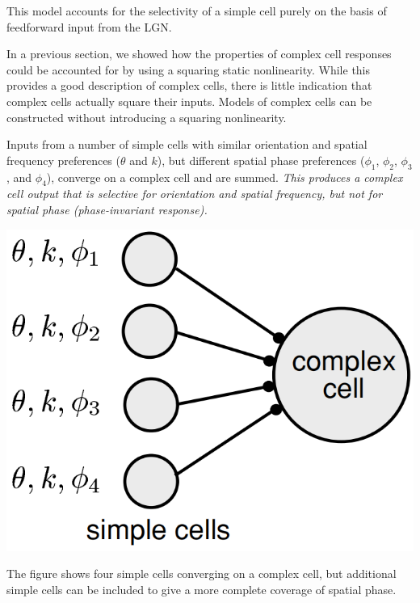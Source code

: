 \begin{rem}
  This model accounts for the selectivity of a simple cell purely on the basis of feedforward input from the LGN.
\end{rem}

\begin{rem}
  In a previous section, we showed how the properties of complex cell responses could be accounted for by using a squaring static nonlinearity. While this provides a good description of complex cells, there is little indication that complex cells actually square their inputs. Models of complex cells can be constructed without introducing a squaring nonlinearity.
\end{rem}

\begin{exm}
  \label{exm:complexCellModel}
   Inputs from a number of simple cells with similar orientation and
spatial frequency preferences ($\theta$ and $k$), but different spatial phase preferences ($\phi_1$, $\phi_2$, $\phi_3$, and $\phi_4$), converge on a complex cell and are summed. \emph{This produces a complex cell output that is selective for orientation and spatial frequency, but not for spatial phase (phase-invariant response).}
  \begin{center}
    \includegraphics[scale=0.18]{./png/complexCellModel}
  \end{center}
  The figure shows four simple cells converging on a complex cell, but additional simple cells can be included to give a more complete coverage of spatial phase.
\end{exm}


